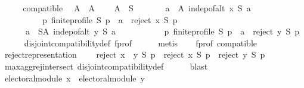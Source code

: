 \begin{isabellebody}
%
\isadelimproof
%
\endisadelimproof
%
\isatagproof
{}\isamarkupfalse%
\ {\isacharminus}{\kern0pt}\isanewline
\ \ \isamarkupfalse%
\ compatible\ \isamarkupfalse%
\ A\ \ A{\isacharcolon}{\kern0pt}\isanewline
\ \ \ \ {\isachardoublequoteopen}A\ {\isasymsubseteq}\ S\ {\isasymand}\isanewline
\ \ \ \ \ \ {\isacharparenleft}{\kern0pt}{\isasymforall}a\ {\isasymin}\ A{\isachardot}{\kern0pt}\ indep{\isacharunderscore}{\kern0pt}of{\isacharunderscore}{\kern0pt}alt\ x\ S\ a\ {\isasymand}\isanewline
\ \ \ \ \ \ \ \ \ \ {\isacharparenleft}{\kern0pt}{\isasymforall}p{\isachardot}{\kern0pt}\ finite{\isacharunderscore}{\kern0pt}profile\ S\ p\ {\isasymlongrightarrow}\ a\ {\isasymin}\ reject\ x\ S\ p{\isacharparenright}{\kern0pt}{\isacharparenright}{\kern0pt}\ {\isasymand}\isanewline
\ \ \ \ \ \ {\isacharparenleft}{\kern0pt}{\isasymforall}a\ {\isasymin}\ S{\isacharminus}{\kern0pt}A{\isachardot}{\kern0pt}\ indep{\isacharunderscore}{\kern0pt}of{\isacharunderscore}{\kern0pt}alt\ y\ S\ a\ {\isasymand}\isanewline
\ \ \ \ \ \ \ \ \ \ {\isacharparenleft}{\kern0pt}{\isasymforall}p{\isachardot}{\kern0pt}\ finite{\isacharunderscore}{\kern0pt}profile\ S\ p\ {\isasymlongrightarrow}\ a\ {\isasymin}\ reject\ y\ S\ p{\isacharparenright}{\kern0pt}{\isacharparenright}{\kern0pt}{\isachardoublequoteclose}\isanewline
\ \ \ \ \isamarkupfalse%
\ disjoint{\isacharunderscore}{\kern0pt}compatibility{\isacharunderscore}{\kern0pt}def\ f{\isacharunderscore}{\kern0pt}prof\isanewline
\ \ \ \ \isamarkupfalse%
\ metis\isanewline
\ \ \isamarkupfalse%
\ f{\isacharunderscore}{\kern0pt}prof\ compatible\isanewline
\ \ \isamarkupfalse%
\ reject{\isacharunderscore}{\kern0pt}representation{\isacharcolon}{\kern0pt}\isanewline
\ \ \ \ {\isachardoublequoteopen}reject\ {\isacharparenleft}{\kern0pt}x\ {\isasymparallel}\isactrlsub {\isasymup}\ y{\isacharparenright}{\kern0pt}\ S\ p\ {\isacharequal}{\kern0pt}\ {\isacharparenleft}{\kern0pt}reject\ x\ S\ p{\isacharparenright}{\kern0pt}\ {\isasyminter}\ {\isacharparenleft}{\kern0pt}reject\ y\ S\ p{\isacharparenright}{\kern0pt}{\isachardoublequoteclose}\isanewline
\ \ \ \ \isamarkupfalse%
\ max{\isacharunderscore}{\kern0pt}agg{\isacharunderscore}{\kern0pt}rej{\isacharunderscore}{\kern0pt}intersect\ disjoint{\isacharunderscore}{\kern0pt}compatibility{\isacharunderscore}{\kern0pt}def\isanewline
\ \ \ \ \isamarkupfalse%
\ blast\isanewline
\ \ \isamarkupfalse%
\ {\isachardoublequoteopen}electoral{\isacharunderscore}{\kern0pt}module\ x\ {\isasymand}\ electoral{\isacharunderscore}{\kern0pt}module\ y{\isachardoublequoteclose}\isanewline

\end{isabellebody}
